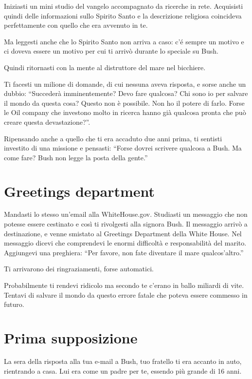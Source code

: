 Iniziasti un mini studio del vangelo accompagnato da ricerche in rete. Acquisisti quindi delle informazioni sullo Spirito Santo e la descrizione religiosa coincideva perfettamente con quello che era avvenuto in te.

Ma leggesti anche che lo Spirito Santo non arriva a caso: c'é sempre un motivo e ci doveva essere un motivo per cui ti arrivò durante lo speciale su Bush.

Quindi ritornasti con la mente al distruttore del mare nel bicchiere.

Ti facesti un milione di domande, di cui nessuna aveva risposta, e sorse anche un dubbio: ``Succederà imminentemente? Devo fare qualcosa? Chi sono io per salvare il mondo da questa cosa? Questo non è possibile. Non ho il potere di farlo. Forse le Oil company che investono molto in ricerca hanno già qualcosa pronta che può creare questa devastazione?''.

Ripensando anche a quello che ti era accaduto due anni prima, ti sentisti investito di una missione e pensasti: ``Forse dovrei scrivere qualcosa a Bush. Ma come fare? Bush non legge la posta della gente.''

\section{Greetings department}
\label{greetings}

Mandasti lo stesso un'email alla WhiteHouse.gov. Studiasti un messaggio che non potesse essere cestinato e così ti rivolgesti alla signora Bush. Il messaggio arrivò a destinazione, e venne smistato al Greetings Department della White House. Nel messaggio dicevi che comprendevi le enormi difficoltà e responsabilità del marito. Aggiungevi una preghiera: “Per favore, non fate diventare il mare qualcos'altro.”

Ti arrivarono dei ringraziamenti, forse automatici.

Probabilmente ti rendevi ridicolo ma secondo te c'erano in ballo miliardi di vite. Tentavi di salvare il mondo da questo errore fatale che poteva essere commesso in futuro.

\section{Prima supposizione}
\label{prima supposizione}

La sera della risposta alla tua e-mail a Bush, tuo fratello ti era accanto in auto, rientrando a casa. Lui era come un padre per te, essendo più grande di 16 anni.

